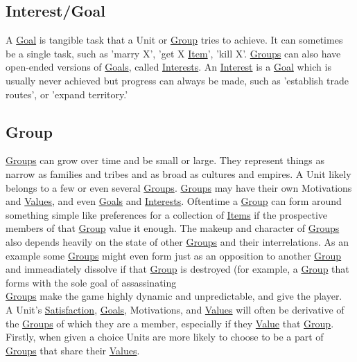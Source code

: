 \documentclass[11pt]{article}
\begin{document}
\subsection{Interest\label{orgc8c6317}\label{orgc5a9408}/Goal\label{orgd0c5ba7}\label{org55b3b0b}}
\label{sec:org882cc66}
A \hyperref[orgd0c5ba7]{Goal} is tangible task that a Unit or \hyperref[org3bac9f0]{Group} tries to achieve. It can sometimes be a single task, such as 'marry X', 'get X \hyperref[org1f7c3b7]{Item}', 'kill X'. \hyperref[org21e4d88]{Groups} can also have open-ended versions of \hyperref[org55b3b0b]{Goals}, called \hyperref[orgc5a9408]{Interests}. An \hyperref[orgc8c6317]{Interest} is a \hyperref[orgd0c5ba7]{Goal} which is usually never achieved but progress can always be made, such as 'establish trade routes', or 'expand territory.'\\
\subsection{Group \label{org3bac9f0} \label{org21e4d88}}
\label{sec:orgd4f165d}
\hyperref[org21e4d88]{Groups} can grow over time and be small or large. They represent things as narrow as families and tribes and as broad as cultures and empires. A Unit likely belongs to a few or even several \hyperref[org21e4d88]{Groups}. \hyperref[org21e4d88]{Groups} may have their own Motivations and \hyperref[orge4a3133]{Values}, and even \hyperref[org55b3b0b]{Goals} and \hyperref[orgc5a9408]{Interests}. Oftentime a \hyperref[org3bac9f0]{Group} can form around something simple like preferences for a collection of \hyperref[org4612467]{Items} if the prospective members of that \hyperref[org3bac9f0]{Group} value it enough. The makeup and character of \hyperref[org21e4d88]{Groups} also depends heavily on the state of other \hyperref[org21e4d88]{Groups} and their interrelations. As an example some \hyperref[org21e4d88]{Groups} might even form just as an opposition to another \hyperref[org3bac9f0]{Group} and immeadiately dissolve if that \hyperref[org3bac9f0]{Group} is destroyed (for example, a \hyperref[org3bac9f0]{Group} that forms with the sole goal of assassinating\\

\hyperref[org21e4d88]{Groups} make the game highly dynamic and unpredictable, and give the player.\\

A Unit's \hyperref[orgda5f73b]{Satisfaction}, \hyperref[org55b3b0b]{Goals}, Motivations, and \hyperref[orge4a3133]{Values} will often be derivative of the \hyperref[org21e4d88]{Groups} of which they are a member, especially if they \hyperref[orgcfc0c4f]{Value} that \hyperref[org3bac9f0]{Group}. Firstly, when given a choice Units are more likely to choose to be a part of \hyperref[org21e4d88]{Groups} that share their \hyperref[orge4a3133]{Values}.\\
\end{document}
